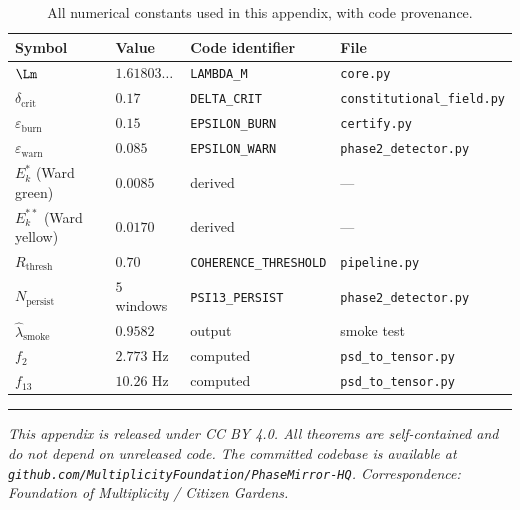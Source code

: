 \documentclass[12pt,a4paper]{article}
\theoremstyle{plain}
\theoremstyle{definition}
\begin{document}
\begin{table}[h!]
  \centering
  \renewcommand{\arraystretch}{1.3}
  \begin{tabular}{llll}
    \toprule
    \textbf{Symbol} & \textbf{Value} & \textbf{Code identifier} & \textbf{File} \\
    \midrule
    $\Lm$ & $1.61803\ldots$ & \texttt{LAMBDA\_M} & \texttt{core.py} \\
    $\delta_{\mathrm{crit}}$ & $0.17$ & \texttt{DELTA\_CRIT} & \texttt{constitutional\_field.py} \\
    $\varepsilon_{\mathrm{burn}}$ & $0.15$ & \texttt{EPSILON\_BURN} & \texttt{certify.py} \\
    $\varepsilon_{\mathrm{warn}}$ & $0.085$ & \texttt{EPSILON\_WARN} & \texttt{phase2\_detector.py} \\
    $E_k^*$ (Ward green) & $0.0085$ & derived & --- \\
    $E_k^{**}$ (Ward yellow) & $0.0170$ & derived & --- \\
    $R_{\mathrm{thresh}}$ & $0.70$ & \texttt{COHERENCE\_THRESHOLD} & \texttt{pipeline.py} \\
    $N_{\mathrm{persist}}$ & $5$ windows & \texttt{PSI13\_PERSIST} & \texttt{phase2\_detector.py} \\
    $\hat\lambda_{\mathrm{smoke}}$ & $0.9582$ & output & smoke test \\
    $f_2$ & $2.773$ Hz & computed & \texttt{psd\_to\_tensor.py} \\
    $f_{13}$ & $10.26$ Hz & computed & \texttt{psd\_to\_tensor.py} \\
    \bottomrule
  \end{tabular}
  \caption{All numerical constants used in this appendix, with code provenance.}
  \label{tab:constants}
\end{table}

\vspace{2em}
\noindent\rule{\linewidth}{0.4pt}
{\small\textit{%
  This appendix is released under CC BY 4.0.
  All theorems are self-contained and do not depend on unreleased code.
  The committed codebase is available at
  \texttt{github.com/MultiplicityFoundation/PhaseMirror-HQ}.
  Correspondence: Foundation of Multiplicity / Citizen Gardens.
}}


\nocite{*}
\printbibliography
\end{document}
